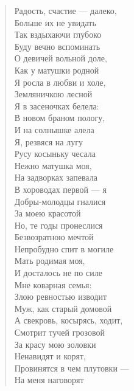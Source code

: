 \begin{verse}
\begin{altverse}
Радость, счастие --- далеко,\\
    Больше их не увидать\ldotst\\
Так вздыхаючи глубоко\\
    Буду вечно вспоминать\\
О девичей вольной доле,\\
    Как у матушки родной\\
Я росла в любви и холе,\\
    Земляничкою лесной\ldotst\\
Я в засеночках белела:\\
    В новом браном пологу,\\
И на солнышке алела\\
    Я, резвяся на лугу\ldotst\\
Русу косыньку чесала\\
    Нежно матушка моя,\\
На задворках запевала\\
    В хороводах первой --- я\ldotst\\
Добры-молодцы гналися\\
    За моею красотой\ldotst\\
Но, те годы пронеслися\\
    Безвозратною мечтой\ldotst\\
Непробудно спит в могиле\\
    Мать родимая моя,\\
И досталось не по силе\\
    Мне коварная семья:\\
Злою ревностью изводит\\
    Муж, как старый домовой\ldotst\\
А свекровь, косырясь, ходит,\\
    Смотрит тучей грозовой\ldotst\\
За красу мою золовки\\
    Ненавидят и корят,\\
Провинятся в чем плутовки ---\\
    На меня наговорят\ldotst\\

\end{altverse}
\end{verse}
